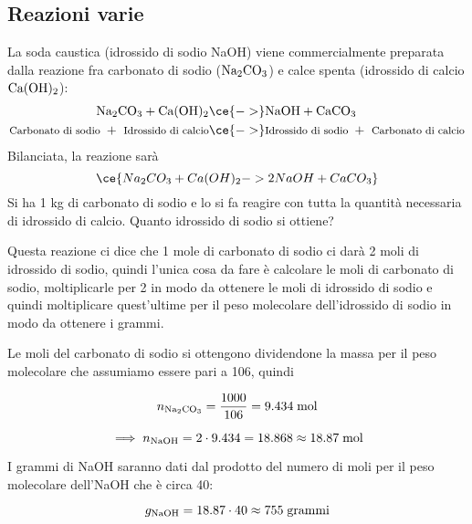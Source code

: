 \newpage

\subsection{Reazioni varie}

\begin{esercizio}[$\bigstar$]
    La soda caustica (idrossido di sodio NaOH) viene commercialmente preparata dalla reazione fra carbonato di sodio ($\rm Na_2CO_3$) e calce spenta (idrossido di calcio $\rm Ca(OH)_2$):
    \begin{equation*}
        \begin{split}
            \rm Na_2CO_3 + Ca(OH)_2
            & \ce{->} \rm NaOH + CaCO_3
            \\
            \text{\footnotesize{Carbonato di sodio }} + \text{ \footnotesize{Idrossido di calcio}}
            & \ce{->} \text{\footnotesize{Idrossido di sodio} } + \text{ \footnotesize{Carbonato di calcio}}
        \end{split}
    \end{equation*}
    Bilanciata, la reazione sarà
    \begin{equation*}
        \ce{Na_2CO_3 + Ca(OH)_2 -> 2NaOH + CaCO_3}
    \end{equation*}
    Si ha 1 kg di carbonato di sodio e lo si fa reagire con tutta la quantità necessaria di idrossido di calcio. Quanto idrossido di sodio si ottiene?
\end{esercizio}
\begin{soluzione}
    Questa reazione ci dice che 1 mole di carbonato di sodio ci darà 2 moli di idrossido di sodio, quindi l'unica cosa da fare è calcolare le moli di carbonato di sodio, moltiplicarle per 2 in modo da ottenere le moli di idrossido di sodio e quindi moltiplicare quest'ultime per il peso molecolare dell'idrossido di sodio in modo da ottenere i grammi.

Le moli del carbonato di sodio si ottengono dividendone la massa per il peso molecolare che assumiamo essere pari a 106, quindi

$$n_{\rm Na_2CO_3}=\frac{1000}{106}=9.434 \; \rm mol$$

$$\implies n_{\text{NaOH}}=2 \cdot 9.434=18.868 \approx 18.87 \; \rm mol$$

I grammi di NaOH saranno dati dal prodotto del numero di moli per il peso molecolare dell'NaOH che è circa 40:

$$g_{\text{NaOH}}=18.87 \cdot 40 \approx 755 \; \rm grammi$$
\end{soluzione}

